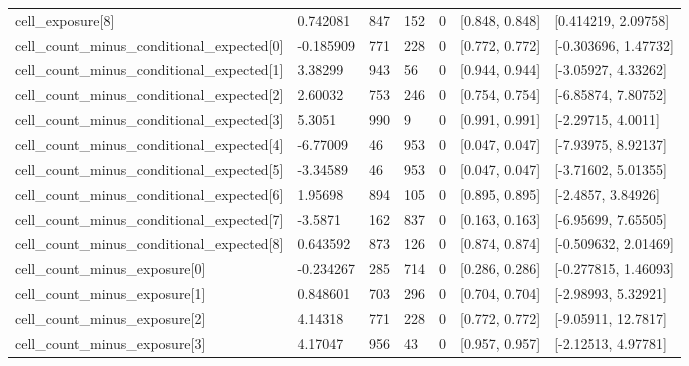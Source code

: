 \begin{longtable}
{}cell\_\allowbreak{}exposure[8] & 0.742081 & 847 & 152 & 0 & [0.848, 0.848] & [0.414219, 2.09758] \\
{}cell\_\allowbreak{}count\_\allowbreak{}minus\_\allowbreak{}conditional\_\allowbreak{}expected[0] & -0.185909 & 771 & 228 & 0 & [0.772, 0.772] & [-0.303696, 1.47732] \\
{}cell\_\allowbreak{}count\_\allowbreak{}minus\_\allowbreak{}conditional\_\allowbreak{}expected[1] & 3.38299 & 943 & 56 & 0 & [0.944, 0.944] & [-3.05927, 4.33262] \\
{}cell\_\allowbreak{}count\_\allowbreak{}minus\_\allowbreak{}conditional\_\allowbreak{}expected[2] & 2.60032 & 753 & 246 & 0 & [0.754, 0.754] & [-6.85874, 7.80752] \\
{}cell\_\allowbreak{}count\_\allowbreak{}minus\_\allowbreak{}conditional\_\allowbreak{}expected[3] & 5.3051 & 990 & 9 & 0 & [0.991, 0.991] & [-2.29715, 4.0011] \\
{}cell\_\allowbreak{}count\_\allowbreak{}minus\_\allowbreak{}conditional\_\allowbreak{}expected[4] & -6.77009 & 46 & 953 & 0 & [0.047, 0.047] & [-7.93975, 8.92137] \\
{}cell\_\allowbreak{}count\_\allowbreak{}minus\_\allowbreak{}conditional\_\allowbreak{}expected[5] & -3.34589 & 46 & 953 & 0 & [0.047, 0.047] & [-3.71602, 5.01355] \\
{}cell\_\allowbreak{}count\_\allowbreak{}minus\_\allowbreak{}conditional\_\allowbreak{}expected[6] & 1.95698 & 894 & 105 & 0 & [0.895, 0.895] & [-2.4857, 3.84926] \\
{}cell\_\allowbreak{}count\_\allowbreak{}minus\_\allowbreak{}conditional\_\allowbreak{}expected[7] & -3.5871 & 162 & 837 & 0 & [0.163, 0.163] & [-6.95699, 7.65505] \\
{}cell\_\allowbreak{}count\_\allowbreak{}minus\_\allowbreak{}conditional\_\allowbreak{}expected[8] & 0.643592 & 873 & 126 & 0 & [0.874, 0.874] & [-0.509632, 2.01469] \\
{}cell\_\allowbreak{}count\_\allowbreak{}minus\_\allowbreak{}exposure[0] & -0.234267 & 285 & 714 & 0 & [0.286, 0.286] & [-0.277815, 1.46093] \\
{}cell\_\allowbreak{}count\_\allowbreak{}minus\_\allowbreak{}exposure[1] & 0.848601 & 703 & 296 & 0 & [0.704, 0.704] & [-2.98993, 5.32921] \\
{}cell\_\allowbreak{}count\_\allowbreak{}minus\_\allowbreak{}exposure[2] & 4.14318 & 771 & 228 & 0 & [0.772, 0.772] & [-9.05911, 12.7817] \\
{}cell\_\allowbreak{}count\_\allowbreak{}minus\_\allowbreak{}exposure[3] & 4.17047 & 956 & 43 & 0 & [0.957, 0.957] & [-2.12513, 4.97781] \\

\end{longtable}
